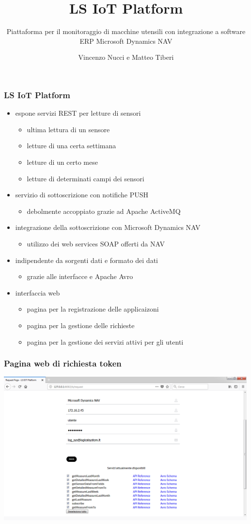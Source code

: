 \documentclass{beamer}
\title{LS IoT Platform}
\subtitle{Piattaforma per il monitoraggio di macchine utensili con integrazione a software ERP Microsoft Dynamics NAV}
\author{Vincenzo Nucci e Matteo Tiberi}
\institute{Università di Camerino}
\begin{document}
	\begin{frame}
	\titlepage
\end{frame}

\begin{frame}
\frametitle{LS IoT Platform}
\begin{itemize}
	\item espone servizi REST per letture di sensori
	\begin{itemize}
		\item ultima lettura di un sensore
		\item letture di una certa settimana
		\item letture di un certo mese
		\item letture di determinati campi dei sensori
	\end{itemize}
	\item servizio di sottoscrizione con notifiche PUSH
	\begin{itemize}
		\item debolmente accoppiato grazie ad Apache ActiveMQ
	\end{itemize}
	\item integrazione della sottoscrizione con Microsoft Dynamics NAV
	\begin{itemize}
		\item utilizzo dei web services SOAP offerti da NAV
	\end{itemize}
	\item indipendente da sorgenti dati e formato dei dati
	\begin{itemize}
		\item grazie alle interfacce e Apache Avro
	\end{itemize}
	\item interfaccia web
	\begin{itemize}
		\item pagina per la registrazione delle applicaizoni
		\item pagina per la gestione delle richieste
		\item pagina per la gestione dei servizi attivi per gli utenti
	\end{itemize}
\end{itemize}
\end{frame}

\begin{frame}
\frametitle{Pagina web di richiesta token}
\includegraphics[width=1\textwidth]{images/RequestPagePlatform.png}
\end{frame}
\end{document}
